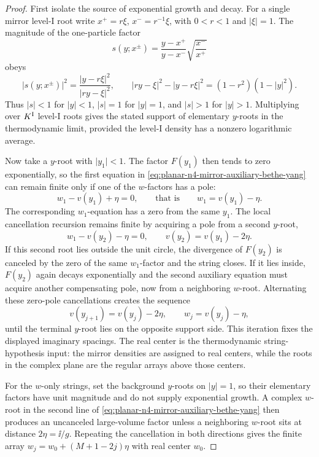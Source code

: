\begin{proof}
First isolate the source of exponential growth and decay.  For a single
mirror level-I root write \(x^+=r\xi\), \(x^-=r^{-1}\xi\), with
\(0<r<1\) and \(\lvert\xi\rvert=1\).  The magnitude of the one-particle
factor
\[
  s(y;x^\pm)=\frac{y-x^+}{y-x^-}\sqrt{\frac{x^-}{x^+}}
\]
obeys
\[
  \lvert s(y;x^\pm)\rvert^2
  =
  \frac{\lvert y-r\xi\rvert^2}{\lvert ry-\xi\rvert^2},
  \qquad
  \lvert ry-\xi\rvert^2-\lvert y-r\xi\rvert^2
  =
  (1-r^2)(1-\lvert y\rvert^2).
\]
Thus \(\lvert s\rvert<1\) for \(\lvert y\rvert<1\), \(\lvert s\rvert=1\)
for \(\lvert y\rvert=1\), and \(\lvert s\rvert>1\) for
\(\lvert y\rvert>1\).  Multiplying over \(K^{\rm I}\) level-I roots gives
the stated support of elementary \(y\)-roots in the thermodynamic limit,
provided the level-I density has a nonzero logarithmic average.

Now take a \(y\)-root with \(\lvert y_1\rvert<1\).  The factor \(F(y_1)\)
then tends to zero exponentially, so the first equation in
\eqref{eq:planar-n4-mirror-auxiliary-bethe-yang} can remain finite only if
one of the \(w\)-factors has a pole:
\[
  w_1-v(y_1)+\eta=0,
  \qquad\text{that is}\qquad
  w_1=v(y_1)-\eta .
\]
The corresponding \(w_1\)-equation has a zero from the same \(y_1\).  The
local cancellation recursion remains finite by acquiring a pole from a second
\(y\)-root,
\[
  w_1-v(y_2)-\eta=0,
  \qquad
  v(y_2)=v(y_1)-2\eta.
\]
If this second root lies outside the unit circle, the divergence of
\(F(y_2)\) is canceled by the zero of the same \(w_1\)-factor and the string
closes.  If it lies inside, \(F(y_2)\) again decays exponentially and the
second auxiliary equation must acquire another compensating pole, now from a
neighboring \(w\)-root.  Alternating these zero-pole cancellations creates
the sequence
\[
  v(y_{j+1})=v(y_j)-2\eta,\qquad
  w_j=v(y_j)-\eta ,
\]
until the terminal \(y\)-root lies on the opposite support side.  This
iteration fixes the displayed imaginary spacings.  The real
center is the thermodynamic string-hypothesis input: the mirror densities are
assigned to real centers, while the roots in the complex plane are the
regular arrays above those centers.

For the \(w\)-only strings, set the background \(y\)-roots on
\(\lvert y\rvert=1\), so their elementary factors have unit magnitude and do
not supply exponential growth.  A complex \(w\)-root in the second line of
\eqref{eq:planar-n4-mirror-auxiliary-bethe-yang} then produces an uncanceled
large-volume factor unless a neighboring \(w\)-root sits at distance
\(2\eta=\ii/g\).  Repeating the cancellation in both directions gives the
finite array \(w_j=w_0+(M+1-2j)\eta\) with real center \(w_0\).
\end{proof}

